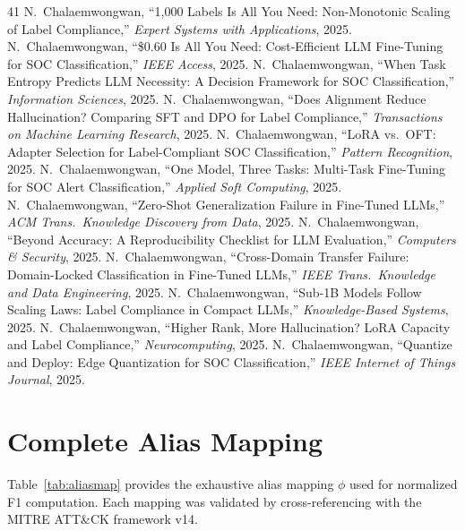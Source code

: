 \documentclass[journal]{IEEEtran}
\begin{document}
\begin{thebibliography}{41}
 N.~Chalaemwongwan, ``1,000 Labels Is All You Need: Non-Monotonic Scaling of Label Compliance,'' \emph{Expert Systems with Applications}, 2025.
 N.~Chalaemwongwan, ``\$0.60 Is All You Need: Cost-Efficient LLM Fine-Tuning for SOC Classification,'' \emph{IEEE Access}, 2025.
 N.~Chalaemwongwan, ``When Task Entropy Predicts LLM Necessity: A Decision Framework for SOC Classification,'' \emph{Information Sciences}, 2025.
 N.~Chalaemwongwan, ``Does Alignment Reduce Hallucination? Comparing SFT and DPO for Label Compliance,'' \emph{Transactions on Machine Learning Research}, 2025.
 N.~Chalaemwongwan, ``LoRA vs.\ OFT: Adapter Selection for Label-Compliant SOC Classification,'' \emph{Pattern Recognition}, 2025.
 N.~Chalaemwongwan, ``One Model, Three Tasks: Multi-Task Fine-Tuning for SOC Alert Classification,'' \emph{Applied Soft Computing}, 2025.
 N.~Chalaemwongwan, ``Zero-Shot Generalization Failure in Fine-Tuned LLMs,'' \emph{ACM Trans.\ Knowledge Discovery from Data}, 2025.
 N.~Chalaemwongwan, ``Beyond Accuracy: A Reproducibility Checklist for LLM Evaluation,'' \emph{Computers \& Security}, 2025.
 N.~Chalaemwongwan, ``Cross-Domain Transfer Failure: Domain-Locked Classification in Fine-Tuned LLMs,'' \emph{IEEE Trans.\ Knowledge and Data Engineering}, 2025.
 N.~Chalaemwongwan, ``Sub-1B Models Follow Scaling Laws: Label Compliance in Compact LLMs,'' \emph{Knowledge-Based Systems}, 2025.
 N.~Chalaemwongwan, ``Higher Rank, More Hallucination? LoRA Capacity and Label Compliance,'' \emph{Neurocomputing}, 2025.
 N.~Chalaemwongwan, ``Quantize and Deploy: Edge Quantization for SOC Classification,'' \emph{IEEE Internet of Things Journal}, 2025.

\end{thebibliography}

\balance

\appendix

\section{Complete Alias Mapping}
\label{app:alias}

Table~\ref{tab:aliasmap} provides the exhaustive alias mapping $\phi$ used for normalized F1 computation. Each mapping was validated by cross-referencing with the MITRE ATT\&CK framework v14.
\end{document}
